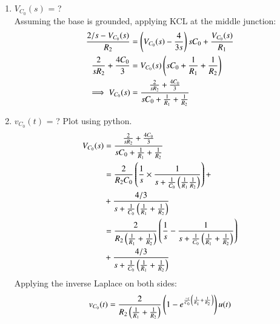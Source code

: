 \documentclass[journal,12pt,twocolumn]{IEEEtran}
\renewcommand\thesection{\arabic{section}}
\begin{document}
\begin{enumerate}[label=\arabic*.,ref=\thesection.\theenumi]
		\label{prob:init}
	
\item $V_{C_0}(s)$ = ?  \\
\solution Assuming the base is grounded, applying KCL at the middle junction:
\begin{align}
    \frac{2/s-V_{C_0}(s)}{R_2} &= \left(V_{C_0}(s)-\frac{4}{3s}\right)sC_0 + \frac{V_{C_0}(s)}{R_1}\\
    \frac{2}{sR_2}+\frac{4C_0}{3}&=V_{C_0}(s)\left(sC_0+\frac{1}{R_1}+\frac{1}{R_2}\right)\\
    \implies V_{C_0}(s) &= \frac{ \frac{2}{sR_2}+\frac{4C_0}{3}}{sC_0+\frac{1}{R_1}+\frac{1}{R_2}}\\
\end{align}
\item $v_{C_0}(t)$ = ? Plot using python.
\begin{align}
         V_{C_0}(s) &= \frac{ \frac{2}{sR_2}+\frac{4C_0}{3}}{sC_0+\frac{1}{R_1}+\frac{1}{R_2}}\\
         &= \frac{2}{R_2C_0}\left(\frac{1}{s}\times\frac{1}{s+\frac{1}{C_0}\left(\frac{1}{R_1}\frac{1}{R_2}\right)}\right)+\nonumber\\&+\frac{4/3}{s+\frac{1}{C_0}\left(\frac{1}{R_1}+\frac{1}{R_2}\right)}\\
         &= \frac{2}{R_2\left(\frac{1}{R_1}+\frac{1}{R_2}\right)}\left(\frac{1}{s}-\frac{1}{s+\frac{1}{C_0}\left(\frac{1}{R_1}+\frac{1}{R_2}\right)}\right)\nonumber\\&+\frac{4/3}{s+\frac{1}{C_0}\left(\frac{1}{R_1}+\frac{1}{R_2}\right)}
\end{align}
Applying the inverse Laplace on both sides:
\begin{align}
    v_{C_0}(t) &= \frac{2}{R_2\brak{\frac{1}{R_1}+\frac{1}{R_2}}}\brak{1-e^{\frac{-t}{C_0}\brak{\frac{1}{R_1}+\frac{1}{R_2}}}}u(t)\nonumber\\

\end{align}
\end{enumerate}
\end{document}
